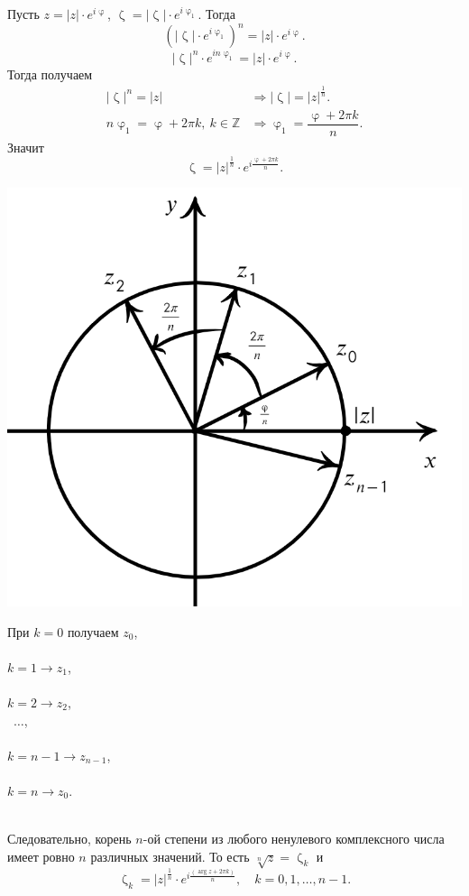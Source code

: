 \documentclass[a4paper, 12pt]{article}
\newcommand{\Z}{\mathbb{Z}}
\renewcommand{\varphi}{\upvarphi}
\newcommand\ef[1]{e^{i#1}}
\begin{document}
Пусть $z = |z|\cdot \ef{\varphi}$, $\upzeta = |\upzeta|\cdot \ef{\varphi_1}$. Тогда $$(|\upzeta|\cdot \ef{\varphi_1})^n = |z|\cdot  \ef{\varphi}.$$
$$|\upzeta|^n\cdot\ef{n\varphi_1} = |z|\cdot \ef{\varphi}.$$
Тогда получаем
	\begin{align*}
		|\upzeta|^n = |z| &\Rightarrow |\upzeta| = |z|^{\frac1n}.\\
		n\varphi_1 = \varphi + 2\pi k,\ k \in \Z &\Rightarrow \varphi_1 = \dfrac{\varphi + 2\pi k}{n}.
	\end{align*}
Значит $$\upzeta = |z|^{\frac{1}{n}}\cdot \ef{\frac{\varphi + 2\pi k}{n}}.$$
\noindent
\parbox[b][8.5cm][t]{10mm}{
	\includegraphics[scale=0.6]{images/006.png}}
\hfill
\parbox[b][6.5cm][t]{65mm}{
	При $k = 0$ получаем $z_0$,\\\\ $k=1\to z_1$,\\\\ $k=2\to z_2$,\\\ $\ldots$,\\\\ $k=n-1\to z_{n-1}$,\\\\ $k = n\to z_0$. }\\
Следовательно, корень $n$-ой степени из любого ненулевого комплексного числа имеет ровно $n$ различных значений. То есть $\sqrt[n]{z} = \upzeta_k$ и $$\upzeta_k = |z|^{\frac1n}\cdot \ef{\frac{(\arg z + 2\pi k)}{n}},\quad k = 0,1,\ldots,n-1.$$
\end{document}
